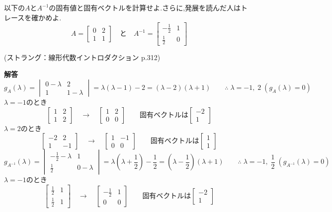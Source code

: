 以下の$A$と$A^{-1}$の固有値と固有ベクトルを計算せよ.さらに,発展を読んだ人はトレースを確かめよ.
\[
A=\begin{bmatrix}0 & 2 \\ 1 & 1\end{bmatrix}
\quad\text{と}\quad
A^{-1}=\begin{bmatrix}-\frac{1}{2} & 1 \\ \frac{1}{2} & 0\end{bmatrix}
\]
\begin{flushright}
    (ストラング：線形代数イントロダクション p.312)
\end{flushright}
\noindent
\textbf{解答}\\
\[
g_A(\lambda)=\begin{vmatrix}
    0-\lambda & 2 \\ 1 & 1-\lambda
\end{vmatrix}=\lambda(\lambda-1)-2=(\lambda-2)(\lambda+1)\qquad \therefore\;\lambda=-1,\;2 \;(g_A(\lambda)=0)\]
$\lambda=-1$のとき
\[
\begin{bmatrix}1 & 2 \\ 1 & 2\end{bmatrix} 
\quad \rightarrow \quad
\begin{bmatrix}1 & 2 \\ 0 & 0\end{bmatrix} \qquad 
\text{固有ベクトルは}\begin{bmatrix}
    -2 \\ 1
\end{bmatrix}
\]
$\lambda=2$のとき
\[
\begin{bmatrix}-2 & 2 \\ 1 & -1\end{bmatrix} 
\quad \rightarrow \quad
\begin{bmatrix}1 & -1 \\ 0 & 0\end{bmatrix} \qquad 
\text{固有ベクトルは}\begin{bmatrix}
    1 \\ 1
\end{bmatrix}
\]
\[
g_{A^{-1}}(\lambda)=\begin{vmatrix}
    -\frac{1}{2}-\lambda & 1 \\ \frac{1}{2} & 0-\lambda
\end{vmatrix}=\lambda(\lambda+\frac{1}{2})-\frac{1}{2}=(\lambda-\frac{1}{2})(\lambda+1)\qquad \therefore\;\lambda=-1,\;\frac{1}{2} \;(g_{A^{-1}}(\lambda)=0)\]
$\lambda=-1$のとき
\[
\begin{bmatrix}\frac{1}{2} & 1 \\ \frac{1}{2} & 1\end{bmatrix}
\quad \rightarrow \quad
\begin{bmatrix}-\frac{1}{2} & 1 \\ 0 & 0\end{bmatrix} \qquad
\text{固有ベクトルは}\begin{bmatrix}
    -2 \\ 1
\end{bmatrix}
\]
